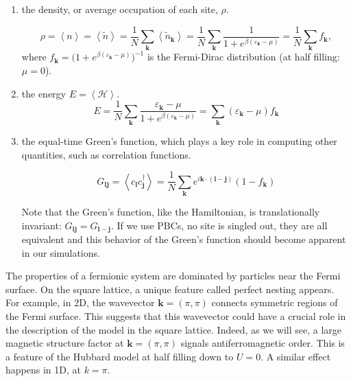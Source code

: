 \begin{enumerate}
\item the density, or average occupation of each site, $\rho$.

\begin{equation}
\rho = \left\langle n \right\rangle = \left\langle \tilde{n} \right\rangle = \frac{1}{N} \sum_{{\bm k}} \left\langle \tilde{n}_{\bm k} \right\rangle  = \frac{1}{N} \sum_{\bm k}  \frac{1}{1 + e^{\beta (\varepsilon_{\bm k} - \mu)}} = \frac{1}{N} \sum_{\bm k}  f_{\bm k} ,
\end{equation}
where $f_{\bm k} = \big(1 + e^{\beta(\varepsilon_{\bm k} - \mu)} \big)^{-1}$ is the Fermi-Dirac distribution (at half filling: $\mu = 0$).

\item the energy $E = \left\langle \mathcal{H} \right\rangle$.
\begin{equation}
E = \frac{1}{N} \sum_{\bm k} \frac{\varepsilon_{\bm k} - \mu}{1 + e^{\beta(\varepsilon_{\bm k} - \mu)}} = \sum_{\bm k} (\varepsilon_{\bm k} - \mu) f_{\bm k}
\end{equation}

\item the equal-time Green's function, which plays a key role in computing other quantities, such as correlation functions.

\begin{equation}\label{eq:eqGreenNonInt}
G_{\bm l \bm j} = \left\langle c_{\bm l} c_{\bm j}^\dagger \right\rangle = \frac{1}{N} \sum_{\bm k} e^{ i {\bm k} \cdot ( \bm l -\bm  j ) } ( 1 - f_{\bm k} )
\end{equation}

Note that the Green's function, like the Hamiltonian, is translationally invariant: $G_{\bm l \bm j} = G_{\bm l-\bm j}$. 
If we use PBCs, no site is singled out, they are all equivalent and this behavior of the Green's function should become apparent in our simulations.
\end{enumerate}

The properties of a fermionic system are dominated by particles near the Fermi surface.
On the square lattice, a unique feature called perfect nesting appears. 
For example, in \acs{2D}, the wavevector $\bm k = (\pi , \pi)$ connects symmetric regions of the Fermi surface.
This suggests that this wavevector could have a crucial role in the description of the model in the square lattice.
Indeed, as we will see, a large magnetic structure factor at $\bm k = (\pi , \pi)$ signals antiferromagnetic order.
This is a feature of the Hubbard model at half filling down to $U = 0$.
A similar effect happens in \acs{1D}, at $k = \pi$.

